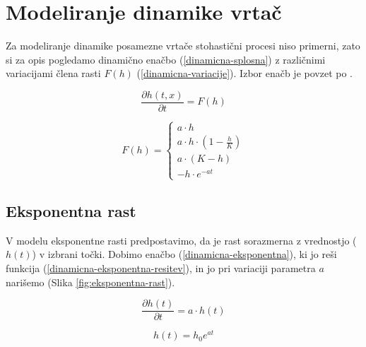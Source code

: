 \documentclass[a4paper, twoside, 12pt]{book}
\begin{document}
    \section{Modeliranje dinamike vrtač}

    Za modeliranje dinamike posamezne vrtače stohastični procesi niso primerni, zato si za opis pogledamo dinamično enačbo (\ref{dinamicna-splosna}) z različnimi variacijami člena rasti $F(h)$ (\ref{dinamicna-variacije}). Izbor enačb je povzet po \cite{kandler2010population}.

    \begin{equation}
      \frac{ \partial h(t,x) }{ \partial t} = F(h)
      \label{dinamicna-splosna}
    \end{equation}

    \begin{equation}
      F(h) = \left \{ \begin{array}{lr} 
        a \cdot h \\
        a \cdot h \cdot (1 - \frac{h}{K}) \\
        a \cdot (K - h) \\
        - h \cdot e^{-a t}
      \end{array} \right. 
      \label{dinamicna-variacije}
    \end{equation}

    \subsection{Eksponentna rast}

    V modelu eksponentne rasti predpostavimo, da je rast sorazmerna z vrednostjo ($h(t)$) v izbrani točki. Dobimo enačbo (\ref{dinamicna-eksponentna}), ki jo reši funkcija (\ref{dinamicna-eksponentna-resitev}), in jo pri variaciji parametra $a$ narišemo (Slika \ref{fig:eksponentna-rast}).

    \begin{equation}
      \frac{\partial h(t)}{\partial t} = a \cdot h(t)
      \label{dinamicna-eksponentna}
    \end{equation}

    \begin{equation}
      h(t) = h_0 e^{a t}
      \label{dinamicna-eksponentna-resitev}
    \end{equation}
\end{document}
